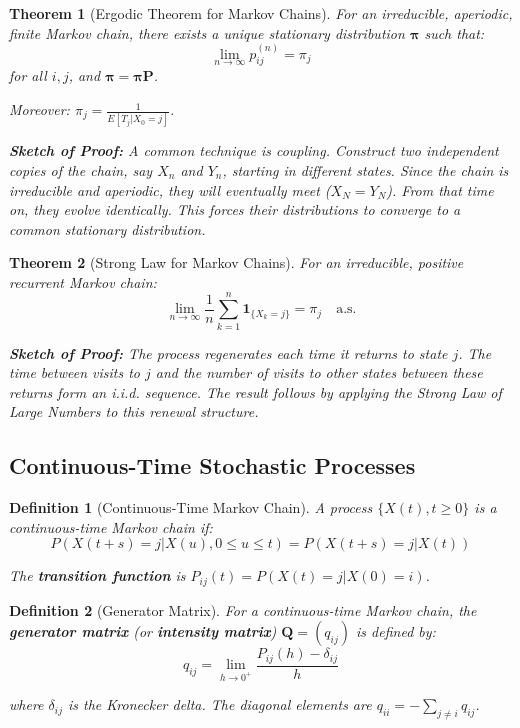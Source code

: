 \documentclass[12pt,a4paper]{article}
\newtheorem{theorem}{Theorem}[section]
\newtheorem{definition}{Definition}[section]
\theoremstyle{remark}
\begin{document}
\begin{theorem}[Ergodic Theorem for Markov Chains]
For an irreducible, aperiodic, finite Markov chain, there exists a unique stationary distribution $\boldsymbol{\pi}$ such that:
$$\lim_{n \to \infty} p_{ij}^{(n)} = \pi_j$$
for all $i,j$, and $\boldsymbol{\pi} = \boldsymbol{\pi} \mathbf{P}$.

Moreover: $\pi_j = \frac{1}{E[T_j | X_0 = j]}$.

\textbf{Sketch of Proof:} A common technique is coupling. Construct two independent copies of the chain, say $X_n$ and $Y_n$, starting in different states. Since the chain is irreducible and aperiodic, they will eventually meet ($X_N = Y_N$). From that time on, they evolve identically. This forces their distributions to converge to a common stationary distribution.
\end{theorem}

\begin{theorem}[Strong Law for Markov Chains]
For an irreducible, positive recurrent Markov chain:
$$\lim_{n \to \infty} \frac{1}{n} \sum_{k=1}^n \mathbf{1}_{\{X_k = j\}} = \pi_j \quad \text{a.s.}$$

\textbf{Sketch of Proof:} The process regenerates each time it returns to state $j$. The time between visits to $j$ and the number of visits to other states between these returns form an i.i.d. sequence. The result follows by applying the Strong Law of Large Numbers to this renewal structure.
\end{theorem}

\subsection{Continuous-Time Stochastic Processes}

\begin{definition}[Continuous-Time Markov Chain]
A process $\{X(t), t \geq 0\}$ is a continuous-time Markov chain if:
$$P(X(t+s) = j | X(u), 0 \leq u \leq t) = P(X(t+s) = j | X(t))$$

The \textbf{transition function} is $P_{ij}(t) = P(X(t) = j | X(0) = i)$.
\end{definition}

\begin{definition}[Generator Matrix]
For a continuous-time Markov chain, the \textbf{generator matrix} (or \textbf{intensity matrix}) $\mathbf{Q} = (q_{ij})$ is defined by:
$$q_{ij} = \lim_{h \to 0^+} \frac{P_{ij}(h) - \delta_{ij}}{h}$$

where $\delta_{ij}$ is the Kronecker delta. The diagonal elements are $q_{ii} = -\sum_{j \neq i} q_{ij}$.
\end{definition}
\end{document}
